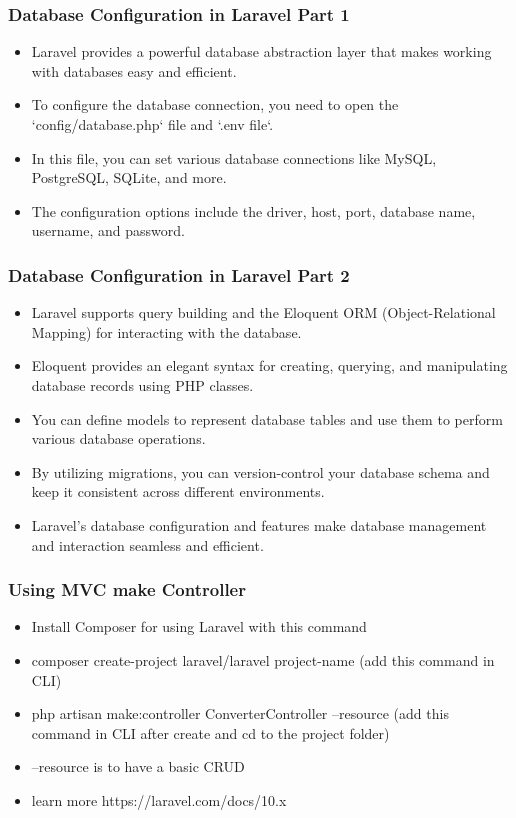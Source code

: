 \documentclass[aspectratio=169, table]{beamer}
\begin{document}
\begin{frame}[fragile]
    \frametitle{Database Configuration in Laravel Part 1}
    \begin{itemize}
        \item Laravel provides a powerful database abstraction layer that makes working with databases easy and efficient.
        \item To configure the database connection, you need to open the `config/database.php` file and `.env file`.
        \item In this file, you can set various database connections like MySQL, PostgreSQL, SQLite, and more.
        \item The configuration options include the driver, host, port, database name, username, and password.
    \end{itemize}
\end{frame}

\begin{frame}[fragile]
    \frametitle{Database Configuration in Laravel Part 2}
    \vspace{5mm}
    \begin{itemize}
        \item Laravel supports query building and the Eloquent ORM (Object-Relational Mapping) for interacting with the database.
        \item Eloquent provides an elegant syntax for creating, querying, and manipulating database records using PHP classes.
        \item You can define models to represent database tables and use them to perform various database operations.
        \item By utilizing migrations, you can version-control your database schema and keep it consistent across different environments.
        \item Laravel's database configuration and features make database management and interaction seamless and efficient.
    \end{itemize}
\end{frame}


\begin{frame}[fragile]
    \frametitle{Using MVC make Controller}
    \begin{itemize}
        \item Install Composer for using Laravel with this command
        \item composer create-project laravel/laravel project-name (add this command in CLI)
        \item php artisan make:controller ConverterController --resource (add this command in CLI after create and cd to the project folder)
        \item --resource is to have a basic CRUD
        \item learn more https://laravel.com/docs/10.x
    \end{itemize}
\end{frame}
\end{document}
